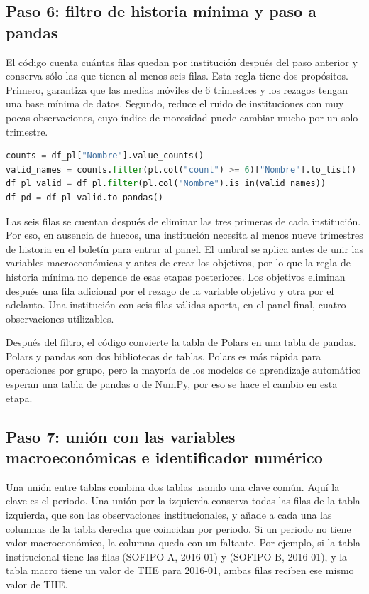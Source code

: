 \subsection{Paso 6: filtro de historia mínima y paso a pandas}
El código cuenta cuántas filas quedan por institución después del paso anterior y conserva sólo las que tienen al menos seis filas. Esta regla tiene dos propósitos. Primero, garantiza que las medias móviles de 6 trimestres y los rezagos tengan una base mínima de datos. Segundo, reduce el ruido de instituciones con muy pocas observaciones, cuyo índice de morosidad puede cambiar mucho por un solo trimestre.

\begin{lstlisting}[language=Python, caption={Filtro de instituciones con al menos seis observaciones y paso a pandas}, label={lst:met_minimo6}]
counts = df_pl["Nombre"].value_counts()
valid_names = counts.filter(pl.col("count") >= 6)["Nombre"].to_list()
df_pl_valid = df_pl.filter(pl.col("Nombre").is_in(valid_names))
df_pd = df_pl_valid.to_pandas()
\end{lstlisting}

Las seis filas se cuentan después de eliminar las tres primeras de cada institución. Por eso, en ausencia de huecos, una institución necesita al menos nueve trimestres de historia en el boletín para entrar al panel. El umbral se aplica antes de unir las variables macroeconómicas y antes de crear los objetivos, por lo que la regla de historia mínima no depende de esas etapas posteriores. Los objetivos eliminan después una fila adicional por el rezago de la variable objetivo y otra por el adelanto. Una institución con seis filas válidas aporta, en el panel final, cuatro observaciones utilizables. %

Después del filtro, el código convierte la tabla de Polars en una tabla de pandas. Polars y pandas son dos bibliotecas de tablas. Polars es más rápida para operaciones por grupo, pero la mayoría de los modelos de aprendizaje automático esperan una tabla de pandas o de NumPy, por eso se hace el cambio en esta etapa.

\subsection{Paso 7: unión con las variables macroeconómicas e identificador numérico}
Una unión entre tablas combina dos tablas usando una clave común. Aquí la clave es el periodo. Una unión por la izquierda conserva todas las filas de la tabla izquierda, que son las observaciones institucionales, y añade a cada una las columnas de la tabla derecha que coincidan por periodo. Si un periodo no tiene valor macroeconómico, la columna queda con un faltante. Por ejemplo, si la tabla institucional tiene las filas (SOFIPO A, 2016-01) y (SOFIPO B, 2016-01), y la tabla macro tiene un valor de TIIE para 2016-01, ambas filas reciben ese mismo valor de TIIE.

